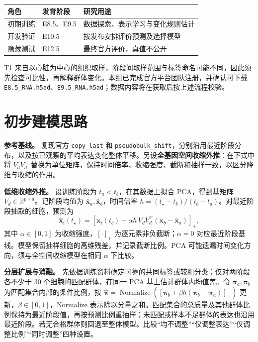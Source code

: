 \documentclass[UTF8,zihao=-4,fontset=none,a4paper]{ctexart}
\newcommand{\smalltable}{\small\renewcommand{\arraystretch}{1.18}}
\begin{document}
\begin{center}
\smalltable
\begin{tabularx}{\linewidth}{@{}p{2.0cm}p{2.8cm}Y@{}}
\toprule
角色 & 发育阶段 & 研究用途\\
\midrule
初期训练 & E8.5、E9.5 & 数据探索、表示学习与变化规则估计\\
开发验证 & E10.5 & 按发布安排评价预测及选择模型\\
隐藏测试 & E12.5 & 最终官方评价，真值不公开\\
\bottomrule
\end{tabularx}
\end{center}

T1 来自以心脏为中心的组织取样，阶段间取样范围与标签命名可能不同\cite{data}，因此须先检查可比性，再解释群体变化。本组已完成官方平台团队注册，并确认可下载 \texttt{E8.5\_RNA.h5ad}、\texttt{E9.5\_RNA.h5ad}；数据内容将在获取后按上述流程校验。

\newpage
\section{初步建模思路}
\textbf{参考基线。} 复现官方 \texttt{copy\_last} 和 \texttt{pseudobulk\_shift}\cite{task}，分别沿用最近阶段分布，以及按已观察的平均表达变化整体平移。另设\textbf{全基因空间收缩外推}：在下式中将 $V_dV_d^\top$ 替换为单位矩阵，保持时间倍率、收缩强度、截断和抽样一致，以区分降维与收缩的作用。

\textbf{低维收缩外推。} 设训练阶段为 $t_a<t_b$，在其数据上拟合 PCA，得到基矩阵 $V_d\in\mathbb{R}^{p\times d}$。记阶段均值为 $\bar{\bm x}_a,\bar{\bm x}_b$，时间倍率 $h=(t_\star-t_b)/(t_b-t_a)$。对最近阶段抽取的细胞，预测为
\begin{equation}
\widehat{\bm x}_i(t_\star)=
\left[
\bm x_i(t_b)+
\alpha h\,
V_dV_d^\top(\bar{\bm x}_b-\bar{\bm x}_a)
\right]_+ ,
\label{eq:model}
\end{equation}
其中 $\alpha\in[0,1]$ 为收缩强度，$[\cdot]_+$ 为逐元素非负截断；$\alpha=0$ 对应最近阶段基线。模型保留抽样细胞的高维残差，并记录截断比例。PCA 可能遗漏时间变化方向，须与全空间收缩模型在相同 $\alpha$ 下比较。

\textbf{分层扩展与消融。} 先依据训练资料确定可靠的共同标签或较粗分类；仅对两阶段各不少于 30 个细胞的匹配群体，在同一 PCA 基上估计群体内均值差。令 $\bm\pi_a,\bm\pi_b$ 为匹配集合内部的条件比例，按
$\widehat{\bm\pi}=\operatorname{Normalize}([\bm\pi_b+\beta h(\bm\pi_b-\bm\pi_a)]_+)$
更新，$\beta\in[0,1]$，Normalize 表示除以分量之和。匹配集合的总质量及其他群体比例保持为最近阶段值，再按预测比例重抽样；未匹配或样本不足群体的表达也沿用最近阶段。若无合格群体则回退至整体模型。比较“均不调整”“仅调整表达”“仅调整比例”“同时调整”四种设置。
\end{document}

